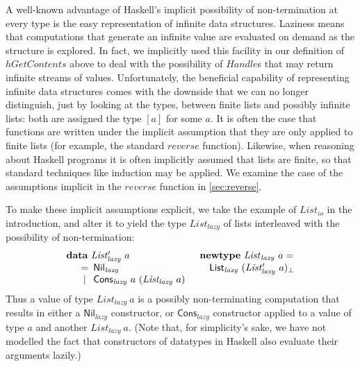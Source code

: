 \documentclass{jfp1}
\newcommand{\kw}[1]{\textbf{#1}}
\begin{document}
A well-known advantage of Haskell's implicit possibility of
non-termination at every type is the easy representation of infinite
data structures. Laziness means that computations that generate an
infinite value are evaluated on demand as the structure is
explored. In fact, we implicitly used this facility in our definition
of $\mathit{hGetContents}$ above to deal with the possibility of
$\mathit{Handle}$s that may return infinite streams of
values. Unfortunately, the beneficial capability of representing
infinite data structures comes with the downside that we can no longer
distinguish, just by looking at the types, between finite lists and
possibly infinite lists: both are assigned the type $[a]$ for some
$a$. It is often the case that functions are written under the
implicit assumption that they are only applied to finite lists (for
example, the standard $\mathit{reverse}$ function). Likewise, when
reasoning about Haskell programs it is often implicitly assumed that
lists are finite, so that standard techniques like induction may be
applied. We examine the case of the assumptions implicit in the
$\mathit{reverse}$ function in \autoref{sec:reverse}.

To make these implicit assumptions explicit, we take the example of
$\mathit{List_{io}}$ in the introduction, and alter it to yield the
type $\mathit{List_{lazy}}$ of lists interleaved with the possibility
of non-termination:
\begin{displaymath}
  \begin{array}{ll}
    \kw{data}~\mathit{List'_{\mathit{lazy}}}~a
    &
    \kw{newtype}~\mathit{List}_{\mathit{lazy}}~a =
    \\
    \quad
    \begin{array}[t]{c@{\hspace{0.5em}}l}
      = & \mathsf{Nil_{\mathit{lazy}}} \\
      | & \mathsf{Cons_{\mathit{lazy}}}~a~(\mathit{List_{lazy}}~a) \\
    \end{array}
    &
    \quad \mathsf{List}_{\mathit{lazy}}~(\mathit{List'_{lazy}}~a)_\bot
  \end{array}
\end{displaymath}
Thus a value of type $\mathit{List_{lazy}}~a$ is a possibly
non-terminating computation that results in either a
$\mathsf{Nil}_{\mathit{lazy}}$ constructor, or
$\mathsf{Cons}_{\mathit{lazy}}$ constructor applied to a value of type
$a$ and another $\mathit{List_{lazy}}~a$. (Note that, for simplicity's
sake, we have not modelled the fact that constructors of datatypes in
Haskell also evaluate their arguments lazily.)
\end{document}
